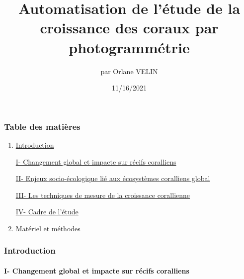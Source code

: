 \documentclass[]{article}
\title{\textbf{Automatisation de l'étude de la croissance des coraux par
photogrammétrie}}
\author{par Orlane VELIN}
\date{11/16/2021}
\let\oldparagraph\paragraph
\renewcommand{\paragraph}[1]{\oldparagraph{#1}\mbox{}}
\begin{document}
\maketitle

\hypertarget{table-des-matiuxe8res}{%
\subsubsection{Table des matières}\label{table-des-matiuxe8res}}

\begin{enumerate}
\def\labelenumi{\arabic{enumi}.}
\item
  \protect\hyperlink{introduction}{Introduction}

  \protect\hyperlink{partieI}{I- Changement global et impacte sur récifs
  coralliens}

  \protect\hyperlink{partieII}{II- Enjeux socio-écologique lié aux
  écosystèmes coralliens global}

  \protect\hyperlink{partieIII}{III- Les techniques de mesure de la
  croissance corallienne}

  \protect\hyperlink{partieIV}{IV- Cadre de l'étude}
\item
  \protect\hyperlink{Matuxe9rielux5cux2520etux5cux2520muxe9thodes}{Matériel
  et méthodes}
\end{enumerate}

\hypertarget{introduction}{%
\subsubsection{Introduction }\label{introduction}}

\hypertarget{i--changement-global-et-impacte-sur-ruxe9cifs-coralliens}{%
\paragraph{I- Changement global et impacte sur récifs coralliens
}\label{i--changement-global-et-impacte-sur-ruxe9cifs-coralliens}}
\end{document}
